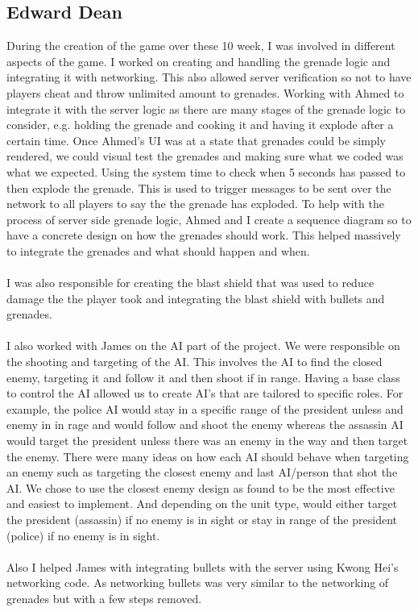 \documentclass[12pt]{article}
\newcommand{\return}{\\\\\noindent}
\begin{document}
\subsection{Edward Dean}
During the creation of the game over these 10 week, I was involved in different aspects of the game. I worked on creating and handling the grenade logic and integrating it with networking. This also allowed server verification so not to have players cheat and throw unlimited amount to grenades. Working with Ahmed to integrate it with the server logic as there are many stages of the grenade logic to consider, e.g. holding the grenade and cooking it and having it explode after a certain time. Once Ahmed’s UI was at a state that grenades could be simply rendered, we could visual test the grenades and making sure what we coded was what we expected. Using the system time to check when 5 seconds has passed to then explode the grenade. This is used to trigger messages to be sent over the network to all players to say the the grenade has exploded. To help with the process of server side grenade logic, Ahmed and I create a sequence diagram so to have a concrete design on how the grenades should work. This helped massively to integrate the grenades and what should happen and when.\return
I was also responsible for creating the blast shield that was used to reduce damage the the player took and integrating the blast shield with bullets and grenades.\return
I also worked with James on the AI part of the project. We were responsible on the shooting and targeting of the AI. This involves the AI to find the closed enemy, targeting it and follow it and then shoot if in range. Having a base class to control the AI allowed us to create AI’s that are tailored to specific roles. For example, the police AI would stay in a specific range of the president unless and enemy in in rage and would follow and shoot the enemy whereas the assassin AI would target the president unless there was an enemy in the way and then target the enemy. There were many ideas on how each AI should behave when targeting an enemy such as targeting the closest enemy and last AI/person that shot the AI. We chose to use the closest enemy design as found to be the most effective and easiest to implement. And depending on the unit type, would either target the president (assassin) if no enemy is in sight or stay in range of the president (police) if no enemy is in sight.\return
Also I helped James with integrating bullets with the server using Kwong Hei’s networking code. As networking bullets was very similar to the networking of grenades but with a few steps removed.
\newpage
\end{document}

